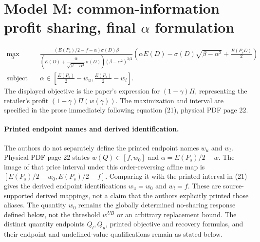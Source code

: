 \documentclass{article}
\begin{document}
\section*{Model M: common-information profit sharing, final $\alpha$ formulation}

\begin{equation}
\begin{aligned}
\max_{\alpha}\quad &
\frac{(E(P_s)/2-f-\alpha)\sigma(D)\beta}
{\left(E(D)+\dfrac{\alpha}{\sqrt{\beta-\alpha^2}}\sigma(D)\right)(\beta-\alpha^2)^{3/2}}
\left(\alpha E(D)-\sigma(D)\sqrt{\beta-\alpha^2}+\frac{E(P_sD)}{2}\right)\\
\text{subject to}\quad &
\alpha\in\left[\frac{E(P_s)}{2}-w_u,\frac{E(P_s)}{2}-w_l\right].
\end{aligned}
\tag{21}
\end{equation}
The displayed objective is the paper's expression for $(1-\gamma)\Pi$, representing the retailer's profit $(1-\gamma)\Pi(w(\gamma))$. The maximization and interval are specified in the prose immediately following equation (21), physical PDF page 22.

\paragraph{Printed endpoint names and derived identification.}
The authors do not separately define the printed endpoint names $w_u$ and $w_l$. Physical PDF page 22 states $w(Q)\in[f,w_0]$ and $\alpha=E(P_s)/2-w$. The image of that price interval under this order-reversing affine map is $[E(P_s)/2-w_0,E(P_s)/2-f]$. Comparing it with the printed interval in (21) gives the derived endpoint identifications $w_u=w_0$ and $w_l=f$. These are source-supported derived mappings, not a claim that the authors explicitly printed those aliases. The quantity $w_0$ remains the globally determined no-sharing response defined below, not the threshold $w^{UB}$ or an arbitrary replacement bound. The distinct quantity endpoints $Q_l,Q_u$, printed objective and recovery formulas, and their endpoint and undefined-value qualifications remain as stated below.
\end{document}
